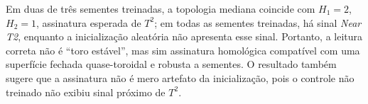 Em duas de três sementes treinadas, a topologia mediana coincide com
$H_1=2$, $H_2=1$, assinatura esperada de $T^2$; em todas as sementes treinadas,
há sinal \emph{Near T2}, enquanto a inicialização aleatória não apresenta esse
sinal. Portanto, a leitura correta não é ``toro estável'', mas sim assinatura
homológica compatível com uma superfície fechada quase-toroidal e robusta a
sementes. O resultado também sugere que a assinatura não é mero artefato da
inicialização, pois o controle não treinado não exibiu sinal próximo de $T^2$.
